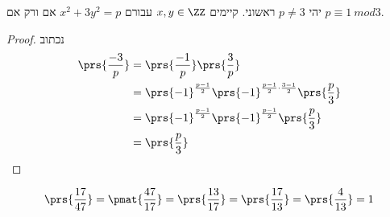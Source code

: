 \documentclass[a4paper,10pt,twoside,openany]{book}
\begin{document}
\begin{theorem}[אוילר]
יהי
$p \neq 3$
ראשוני. קיימים
$x,y \in \ZZ$
עבורם
$x^2 + 3y^2 = p$
אם ורק אם
$p \equiv 1\ mod{3}$.
\end{theorem}
\begin{proof}
נכתוב
\begin{align*}
\prs{\frac{-3}{p}} &= \prs{\frac{-1}{p}} \prs{\frac{3}{p}} \\
&= \prs{-1}^{\frac{p-1}{2}} \prs{-1}^{\frac{p-1}{2} \cdot \frac{3-1}{2}} \prs{\frac{p}{3}}
\\&= \prs{-1}^{\frac{p-1}{2}} \prs{-1}^{\frac{p-1}{2}} \prs{\frac{p}3{}} \\&= \prs{\frac{p}{3}}
\end{align*}
\end{proof}

\begin{example}
\[\prs{\frac{17}{47}} = \pmat{\frac{47}{17}} = \prs{\frac{13}{17}} = \prs{\frac{17}{13}} = \prs{\frac{4}{13}} = 1\]
\end{example}

\backmatter
\end{document}
